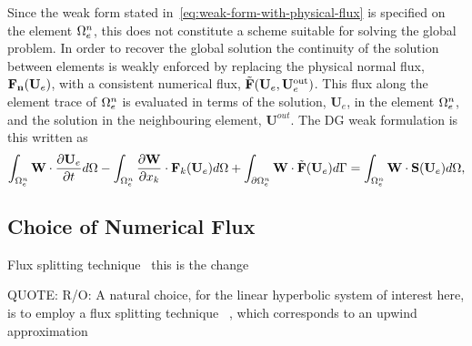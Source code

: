 Since the weak form stated in~\eqref{eq:weak-form-with-physical-flux} is specified on the element $\Omega_e^{n}$, this does not constitute a scheme suitable for solving the global problem. In order to recover the global solution the continuity of the solution between elements is weakly enforced by replacing the physical normal flux, $\mathbf{\mathbf{F}_n}(\mathbf{U}_e)$, with a consistent numerical flux, $\tilde{\mathbf{F}}(\mathbf{U}_e,\mathbf{U}_e^{\textrm{out}})$. This flux along the element trace of $\Omega_e^{n}$ is evaluated in terms of the solution, $\mathbf{U}_e$, in the element $\Omega_e^{n}$, and the solution in the neighbouring element, $\mathbf{U}^{out}$. The DG weak formulation is this written as
\begin{equation}
\int_{\Omega_e^{n}} \mathbf{W} \cdot \frac{\partial \mathbf{U}_e}{\partial t} d\Omega  - \int_{\Omega_e^{n}} \frac{\partial \mathbf{W}}{\partial x_{k}} \cdot
\mathbf{F}_{k}(\mathbf{U}_e) d\Omega + \int_{\partial \Omega_e^{n}} \mathbf{W} \cdot \tilde{\mathbf{F}}(\mathbf{U}_e) d\Gamma
= \int_{\Omega_e^{n}} \mathbf{W} \cdot \mathbf{S}(\mathbf{U}_e) d\Omega,
\label{eq:weak-form-with-numerical-flux}
\end{equation}

\subsection{Choice of Numerical Flux}
Flux splitting technique~\cite{donea2003finite} this is the change


QUOTE: R/O: A natural choice, for the linear hyperbolic
system of interest here, is to employ a flux splitting technique
~\cite{donea2003finite}, which corresponds to an upwind approximation \cite{chen2005high}


